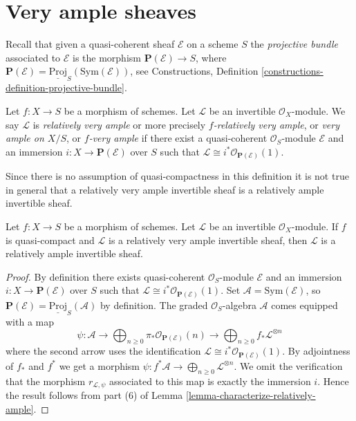 \section{Very ample sheaves}
\label{section-very-ample}

\noindent
Recall that given a quasi-coherent sheaf $\mathcal{E}$ on a scheme
$S$ the {\it projective bundle} associated to $\mathcal{E}$ is the morphism
$\mathbf{P}(\mathcal{E}) \to S$, where
$\mathbf{P}(\mathcal{E}) = \underline{\text{Proj}}_S(\text{Sym}(\mathcal{E}))$,
see
Constructions, Definition \ref{constructions-definition-projective-bundle}.

\begin{definition}
\label{definition-very-ample}
Let $f : X \to S$ be a morphism of schemes.
Let $\mathcal{L}$ be an invertible $\mathcal{O}_X$-module.
We say $\mathcal{L}$ is {\it relatively very ample} or more
precisely {\it $f$-relatively very ample}, or
{\it very ample on $X/S$}, or {\it $f$-very ample} if
there exist a quasi-coherent $\mathcal{O}_S$-module
$\mathcal{E}$ and an immersion $i : X \to \mathbf{P}(\mathcal{E})$
over $S$ such that
$\mathcal{L} \cong i^*\mathcal{O}_{\mathbf{P}(\mathcal{E})}(1)$.
\end{definition}



\noindent
Since there is no assumption of quasi-compactness in this definition it is not
true in general that a relatively very ample invertible sheaf is a relatively
ample invertible sheaf.

\begin{lemma}
\label{lemma-ample-very-ample}
\begin{reference}
\cite[II, Proposition 4.6.2]{EGA}
\end{reference}
Let $f : X \to S$ be a morphism of schemes.
Let $\mathcal{L}$ be an invertible $\mathcal{O}_X$-module.
If $f$ is quasi-compact and $\mathcal{L}$ is a relatively
very ample invertible sheaf, then $\mathcal{L}$ is a relatively
ample invertible sheaf.
\end{lemma}

\begin{proof}
By definition there exists quasi-coherent $\mathcal{O}_S$-module
$\mathcal{E}$ and an immersion $i : X \to \mathbf{P}(\mathcal{E})$
over $S$ such that
$\mathcal{L} \cong i^*\mathcal{O}_{\mathbf{P}(\mathcal{E})}(1)$.
Set $\mathcal{A} = \text{Sym}(\mathcal{E})$, so
$\mathbf{P}(\mathcal{E}) = \underline{\text{Proj}}_S(\mathcal{A})$
by definition. The graded $\mathcal{O}_S$-algebra $\mathcal{A}$
comes equipped with a map
$$
\psi :
\mathcal{A} \to
\bigoplus\nolimits_{n \geq 0}
\pi_*\mathcal{O}_{\mathbf{P}(\mathcal{E})}(n) \to
\bigoplus\nolimits_{n \geq 0}
f_*\mathcal{L}^{\otimes n}
$$
where the second arrow uses the identification
$\mathcal{L} \cong i^*\mathcal{O}_{\mathbf{P}(\mathcal{E})}(1)$.
By adjointness of $f_*$ and $f^*$ we get a morphism
$\psi : f^*\mathcal{A} \to \bigoplus_{n \geq 0}\mathcal{L}^{\otimes n}$.
We omit the verification that the morphism $r_{\mathcal{L}, \psi}$
associated to this map is exactly the immersion $i$.
Hence the result follows from
part (6) of Lemma \ref{lemma-characterize-relatively-ample}.
\end{proof}

